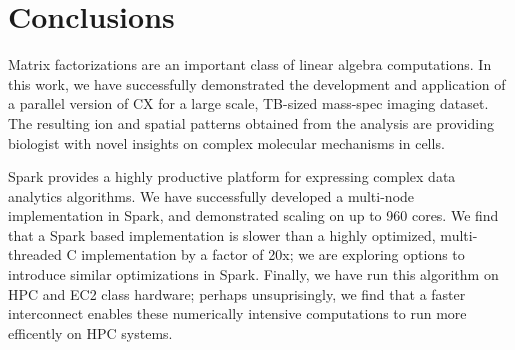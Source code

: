 \section{Conclusions}
\label{sec:conclusion}

Matrix factorizations are an important class of linear algebra computations. In this work, we have successfully demonstrated the development and application of a parallel version of CX for a large scale, TB-sized mass-spec imaging dataset. The resulting ion and spatial patterns obtained from the analysis are providing biologist with novel insights on complex molecular mechanisms in cells. 

Spark provides a highly productive platform for expressing complex data analytics algorithms. We have successfully developed a multi-node implementation in Spark, and demonstrated scaling on up to 960 cores. We find that a Spark based implementation is slower than a highly optimized, multi-threaded C implementation by a factor of 20x; we are exploring options to introduce similar optimizations in Spark. Finally, we have run this algorithm on HPC and EC2 class hardware; perhaps unsuprisingly, we find that a faster interconnect enables these numerically intensive computations to run more efficently on HPC systems. 

